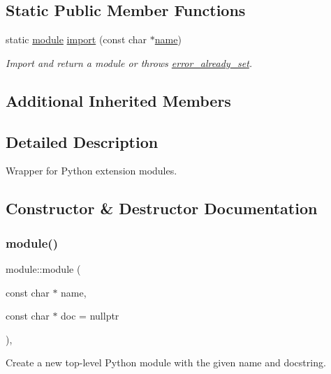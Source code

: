 \subsection*{Static Public Member Functions}
\begin{DoxyCompactItemize}
\item 
static \mbox{\hyperlink{classmodule}{module}} \mbox{\hyperlink{classmodule_a40817edef0ded5727701534bcded9982}{import}} (const char $\ast$\mbox{\hyperlink{structname}{name}})
\begin{DoxyCompactList}\small\item\em Import and return a module or throws {\ttfamily \mbox{\hyperlink{classerror__already__set}{error\+\_\+already\+\_\+set}}}. \end{DoxyCompactList}\end{DoxyCompactItemize}
\subsection*{Additional Inherited Members}


\subsection{Detailed Description}
Wrapper for Python extension modules. 

\subsection{Constructor \& Destructor Documentation}
\mbox{\label{classmodule_abd798017921903073343c4479efb93c0}} 
\subsubsection{\texorpdfstring{module()}{module()}}
{\footnotesize\ttfamily module\+::module (\begin{DoxyParamCaption}\item[{const char $\ast$}]{name,  }\item[{const char $\ast$}]{doc = {\ttfamily nullptr} }\end{DoxyParamCaption})\hspace{0.3cm}{\ttfamily [inline]}, {\ttfamily [explicit]}}



Create a new top-\/level Python module with the given name and docstring. 



